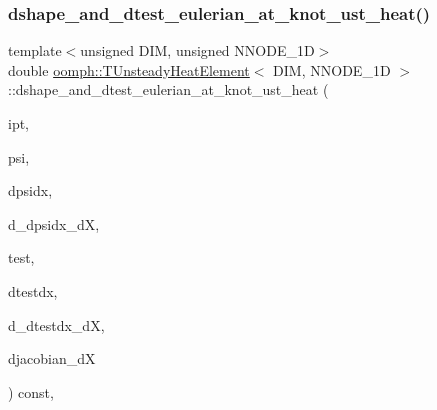 \mbox{\label{classoomph_1_1TUnsteadyHeatElement_a45a721e6148650c201f6aed6a5f38702}} 
\subsubsection{\texorpdfstring{dshape\+\_\+and\+\_\+dtest\+\_\+eulerian\+\_\+at\+\_\+knot\+\_\+ust\+\_\+heat()}{dshape\_and\_dtest\_eulerian\_at\_knot\_ust\_heat()}\hspace{0.1cm}{\footnotesize\ttfamily [2/2]}}
{\footnotesize\ttfamily template$<$unsigned D\+IM, unsigned N\+N\+O\+D\+E\+\_\+1D$>$ \\
double \hyperlink{classoomph_1_1TUnsteadyHeatElement}{oomph\+::\+T\+Unsteady\+Heat\+Element}$<$ D\+IM, N\+N\+O\+D\+E\+\_\+1D $>$\+::dshape\+\_\+and\+\_\+dtest\+\_\+eulerian\+\_\+at\+\_\+knot\+\_\+ust\+\_\+heat (\begin{DoxyParamCaption}\item[{const unsigned \&}]{ipt,  }\item[{\hyperlink{classoomph_1_1Shape}{Shape} \&}]{psi,  }\item[{\hyperlink{classoomph_1_1DShape}{D\+Shape} \&}]{dpsidx,  }\item[{\hyperlink{classoomph_1_1RankFourTensor}{Rank\+Four\+Tensor}$<$ double $>$ \&}]{d\+\_\+dpsidx\+\_\+dX,  }\item[{\hyperlink{classoomph_1_1Shape}{Shape} \&}]{test,  }\item[{\hyperlink{classoomph_1_1DShape}{D\+Shape} \&}]{dtestdx,  }\item[{\hyperlink{classoomph_1_1RankFourTensor}{Rank\+Four\+Tensor}$<$ double $>$ \&}]{d\+\_\+dtestdx\+\_\+dX,  }\item[{\hyperlink{classoomph_1_1DenseMatrix}{Dense\+Matrix}$<$ double $>$ \&}]{djacobian\+\_\+dX }\end{DoxyParamCaption}) const\hspace{0.3cm}{\ttfamily [inline]}, {\ttfamily [protected]}}



